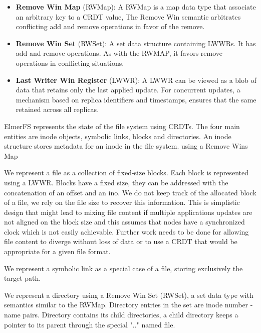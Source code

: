 \documentclass[sigconf, 10pt]{acmart}
\begin{document}
\begin{itemize}
	\item \textbf{Remove Win Map} (RWMap): A RWMap is a map data type that associate an arbitrary key to a CRDT value, The Remove Win semantic arbitrates conflicting add and remove operations in favor of the remove.
	\item \textbf{Remove Win Set} (RWSet): A set data structure containing LWWRs. It has add and
    remove operations. As with the RWMAP, it favors remove operations in conflicting situations.
	\item \textbf{Last Writer Win Register} (LWWR): A LWWR can be viewed as a blob of data that retains only the last applied update.
    For concurrent updates, a mechanism based on replica identifiers and timestamps, ensures that the same retained across all replicas.
\end{itemize}

ElmerFS represents the state of the file system using CRDTs.
The four main entities are inode objects, symbolic links, blocks and directories.
An inode structure stores metadata for an inode in the file system. using a Remove Wins Map

We represent a file as a collection of fixed-size blocks. Each block is represented using a LWWR. Blocks have a fixed size, they can be addressed with the concatenation of an offset and an ino.
We do not keep track of the allocated block of a file, we rely on the file size to recover this information. This is simplistic design that might lead to mixing file content if multiple applications updates are not aligned on the block size and this assumes that nodes have a synchronized clock which is not easily achievable. Further work needs to be done for allowing file content to diverge without loss of data or to use a CRDT that would be appropriate for a given file format.

We represent a symbolic link as a special case of a file, storing exclusively the target path.

We represent a directory using a Remove Win Set (RWSet), a set data type with semantics similar to the RWMap. Directory entries in the set are inode number - name pairs. Directory contains its child directories, a child directory keeps a pointer to its parent through the special ".." named file.

\end{document}
